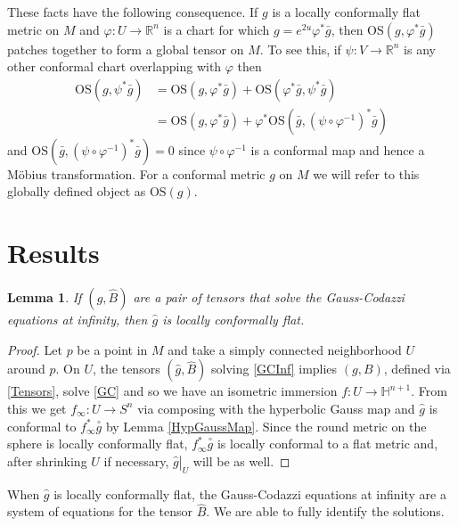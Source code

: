 \documentclass{amsart}
\newcommand{\R}{\mathbb{R}}
\newtheorem{lem}[thm]{Lemma}
\renewcommand{\H}{\mathbb{H}}
\begin{document}
These facts have the following consequence. 
If $g$ is a locally conformally flat metric on $M$ and $\varphi: U \to \R^n$ is a chart for which $g = e^{2u}\varphi^*\bar{g}$, then $\mathrm{OS}(g, \varphi^*\bar{g})$ patches together to form a global tensor on $M$. 
To see this, if $\psi: V \to \R^n$ is any other conformal chart overlapping with $\varphi$ then 
\begin{align*}
\mathrm{OS}(g ,\psi^*\bar{g}) 
&= \mathrm{OS}(g, \varphi^*\bar{g}) + \mathrm{OS}(\varphi^*\bar{g},\psi^*\bar{g}) \\
&= \mathrm{OS}(g, \varphi^*\bar{g}) + \varphi^*\mathrm{OS}(\bar{g},(\psi \circ \varphi^{-1})^*\bar{g})
\end{align*}
and $\mathrm{OS}(\bar{g},(\psi \circ \varphi^{-1})^*\bar{g}) = 0$ since $\psi \circ \varphi^{-1}$ is a conformal map and hence a M\"obius transformation.
For a conformal metric $g$ on $M$ we will refer to this globally defined object as $\mathrm{OS}(g)$.

\section{Results}

\begin{lem}
\label{GCInf-LCF}
If $(\hat{g},\hat{B})$ are a pair of tensors that solve the Gauss-Codazzi equations at infinity, then $\hat{g}$ is locally conformally flat. 
\end{lem}

\begin{proof}
Let $p$ be a point in $M$ and take a simply connected neighborhood $U$ around $p$.
On $U$, the tensors $(\hat{g},\hat{B})$ solving \ref{GCInf} implies $(g,B)$, defined via \eqref{Tensors}, solve \ref{GC} and so we have an isometric immersion $f: U \to \H^{n+1}$.
From this we get $f_\infty: U \to S^n$ via composing with the hyperbolic Gauss map and $\hat{g}$ is conformal to $f_\infty^*\overset{\circ}{g}$ by Lemma \ref{HypGaussMap}. 
Since the round metric on the sphere is locally conformally flat, $f_\infty^*\overset{\circ}{g}$ is locally conformal to a flat metric and, after shrinking $U$ if necessary, $\left.\hat{g}\right|_{U}$ will be as well. 
\end{proof}

When $\hat{g}$ is locally conformally flat, the Gauss-Codazzi equations at infinity are a system of equations for the tensor $\hat{B}$.
We are able to fully identify the solutions. 
\end{document}
